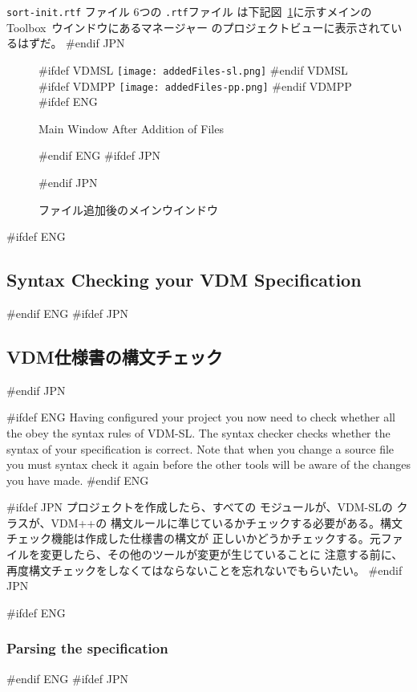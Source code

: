 \documentclass[\pformat,12pt]{article}
\newcommand{\vdmslpp}{VDM-SL}
\newcommand{\Toolbox}{Toolbox}
\newcommand{\vdmslpp}{VDM++}
\newcommand{\Toolbox}{Toolbox}
\newcommand{\guicmd}[1]{{\sf #1}}
\newcommand{\guicmd}[1]{{\gt #1}}
\begin{document}
{
  {\tt sort-init.rtf} ファイル
}
{
  6つの {\tt .rtf}ファイル
}
は下記図~\ref{fig:addedfiles}に示すメインの
\Toolbox\ ウインドウにある\guicmd{マネージャー} の\guicmd{プロジェクトビュー}に表示されているはずだ。
#endif JPN

\begin{figure}[tbh]
\begin{center}
#ifdef VDMSL
\texttt{[image: addedFiles-sl.png]}
#endif VDMSL
#ifdef VDMPP
\texttt{[image: addedFiles-pp.png]}
#endif VDMPP
#ifdef ENG
\caption{Main Window After Addition of Files}
#endif ENG
#ifdef JPN
\caption{ファイル追加後のメインウインドウ}
#endif JPN
\label{fig:addedfiles}
\end{center}
\end{figure}


#ifdef ENG
\subsection{Syntax Checking your VDM Specification}
#endif ENG
#ifdef JPN
\subsection{VDM仕様書の構文チェック} 
#endif JPN

#ifdef ENG
Having configured your project you now need to check whether all the
 obey the syntax rules
of \vdmslpp.  The syntax checker checks whether the syntax of your
specification is correct. Note that when you change a source file you
must syntax check it again before the other tools will be aware of the
changes you have made.
#endif ENG

#ifdef JPN
プロジェクトを作成したら、すべての
{
モジュールが、VDM-SLの
}
{
クラスが、VDM++の
}
構文ルールに準じているかチェックする必要がある。構文チェック機能は作成した仕様書の構文が
正しいかどうかチェックする。元ファイルを変更したら、その他のツールが変更が生じていることに
注意する前に、再度構文チェックをしなくてはならないことを忘れないでもらいたい。
#endif JPN

#ifdef ENG
\subsubsection{Parsing the specification}
#endif ENG
#ifdef JPN
\end{document}
